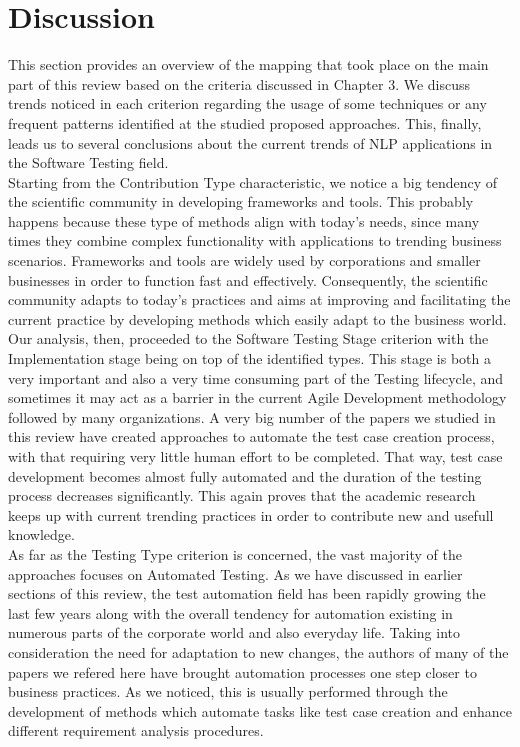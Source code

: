\chapter{Discussion}

This section provides an overview of the mapping that took place on the main part of this review based on the criteria discussed in Chapter 3. We discuss trends noticed 
in each criterion regarding the usage of some techniques or any frequent patterns identified at the studied proposed approaches. This, finally, leads us to several conclusions 
about the current trends of NLP applications in the Software Testing field.\\

Starting from the Contribution Type characteristic, we notice a big tendency of the scientific community in developing frameworks and tools. This probably happens because 
these type of methods align with today's needs, since many times they combine complex functionality with applications to trending business scenarios. Frameworks and tools are 
widely used by corporations and smaller businesses in order to function fast and effectively. Consequently, the scientific community adapts to today's practices and aims at 
improving and facilitating the current practice by developing methods which easily adapt to the business world.\\

Our analysis, then, proceeded to the Software Testing Stage criterion with the Implementation stage being on top of the identified types. This stage is both a very important and 
also a very time consuming part of the Testing lifecycle, and sometimes it may act as a barrier in the current Agile Development methodology followed by many organizations. A very 
big number of the papers we studied in this review have created approaches to automate the test case creation process, with that requiring very little human effort to be completed. 
That way, test case development becomes almost fully automated and the duration of the testing process decreases significantly. This again proves that the academic research keeps 
up with current trending practices in order to contribute new and usefull knowledge.\\

As far as the Testing Type criterion is concerned, the vast majority of the approaches focuses on Automated Testing. As we have discussed in earlier sections of this review, the test automation 
field has been rapidly growing the last few years along with the overall tendency for automation existing in numerous parts of the corporate world and also everyday life. Taking into consideration 
the need for adaptation to new changes, the authors of many of the papers we refered here have brought automation processes one step closer to business practices. As we noticed, this is usually performed through 
the development of methods which automate tasks like test case creation and enhance different requirement analysis procedures.\\

